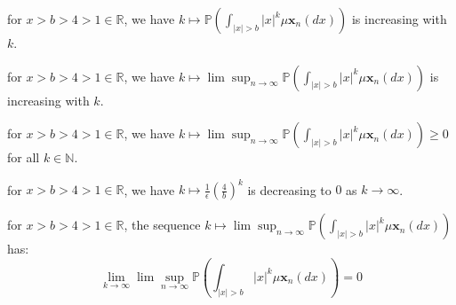 \begin{lemma}
    \label{lem:increasing_sequence_p_of_int_x_to_k}
    \notready

    for $x > b > 4 > 1 \in \mathbb{R}$, we have $k \mapsto \mathbb{P} (\int_{|x| > b}|x|^{k}\mu \mathbf{x}_{n} (dx))$ is increasing with $k$.
\end{lemma}

\begin{lemma}
    \label{lem:increasing_sequence_lim_sup_p}
    \notready

    for $x > b > 4 > 1 \in \mathbb{R}$, we have $k \mapsto \lim\sup_{n\to\infty}\mathbb{P} (\int_{|x| > b}|x|^{k}\mu \mathbf{x}_{n} (dx))$ is increasing with $k$.
\end{lemma}

\begin{lemma}
    \label{lem:nonnegative_sequence_lim_sup_p}
    \notready

    for $x > b > 4 > 1 \in \mathbb{R}$, we have $k \mapsto \lim\sup_{n\to\infty}\mathbb{P} (\int_{|x| > b}|x|^{k}\mu \mathbf{x}_{n} (dx)) \geq 0$ for all $k \in \mathbb{N}$. 
\end{lemma}

\begin{lemma}
    \label{lem:decreasing_sequence_1_over_epsilon_4_over_b_to_k}
    \notready

    for $x > b > 4 > 1 \in \mathbb{R}$, we have $k \mapsto \frac{1}{\epsilon}(\frac{4}{b})^{k}$ is decreasing to $0$ as $k\to\infty$.
\end{lemma}

\begin{lemma}
    \label{lem:limit_of_sequence_lim_sup_p}
    \notready

    for $x > b > 4 > 1 \in \mathbb{R}$, the sequence $k \mapsto \lim\sup_{n\to\infty}\mathbb{P} (\int_{|x| > b}|x|^{k}\mu \mathbf{x}_{n} (dx))$ has:
    $$
    \lim_{k\to\infty} \lim\sup_{n\to\infty}\mathbb{P}(\int_{|x| > b}|x|^{k}\mu \mathbf{x}_{n}(dx)) = 0
    $$ 
\end{lemma}

